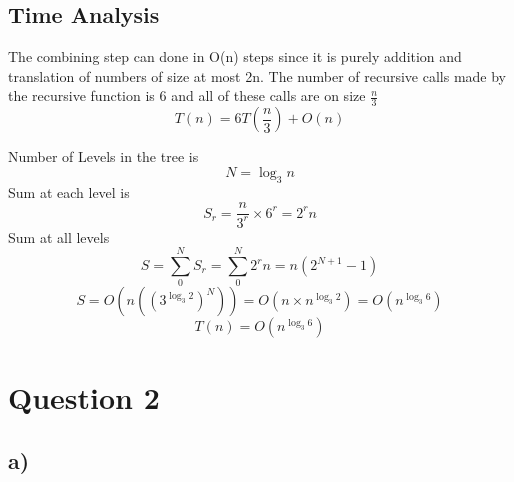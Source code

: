 \documentclass{report}
\begin{document}
 \subsection*{Time Analysis}
 The combining step can done in O(n) steps since it is purely addition and translation of numbers of size at most 2n. The number of recursive calls made by the recursive function is 6 and all of these calls are on size $\frac{n}{3}$\\
 \begin{equation*}
     T(n) = 6T(\frac{n}{3}) + O(n)
 \end{equation*}
 \begin{center} 
\end{center}
Number of Levels in the tree is 
\begin{equation*}
    N = \log_3 n
\end{equation*}
Sum at each level is 
\begin{equation*}
    S_r = \frac{n}{3^r} \times 6^r = 2^rn
\end{equation*}
Sum at all levels
\begin{equation*}
    S = \sum_0^N S_r = \sum_0^N 2^rn = n(2^{N+1} - 1)
\end{equation*}
\begin{equation*}
    S = O(n({(3^{\log_3 2})}^{N})) = O(n\times n^{\log_3 2}) = O(n^{\log_3 6})
\end{equation*}
\begin{equation*}
    T(n) = O(n^{\log_3 6})
\end{equation*}
 \section*{Question 2}
 \subsection*{a)}
\end{document}
